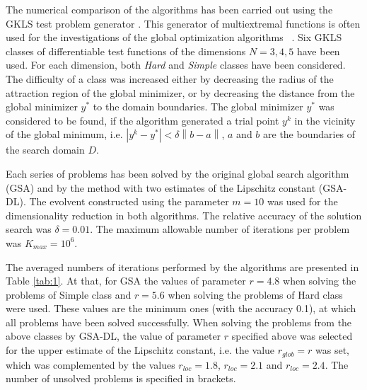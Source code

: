 \documentclass[runningheads]{llncs}
\begin{document}
The numerical comparison of the algorithms has been carried out using the GKLS 
test problem generator \cite{Gaviano2003}. 
This generator of multiextremal functions is often used for the investigations of the global 
optimization algorithms ~\cite{Barkalov2018,Paulavicius2014,Sergeyev2015}.
Six GKLS classes of differentiable test functions of the dimensions $N = 3,4,5$
have been used. For each dimension, both \textit{Hard} and \textit{Simple}
classes have been considered. The difficulty of a class was increased either by
decreasing the radius of the attraction region of the global minimizer, or by
decreasing the distance from the global minimizer $y^\ast$ to the domain
boundaries. The global minimizer $y^\ast$ was considered to be found, if the
algorithm generated a trial point $y^k$ in the vicinity of the global minimum,
i.e. $\left|y^k-y^\ast\right| <\delta\left\|b-a\right\|$, 
$a$ and $b$ are the boundaries of the search domain $D$. 

Each series of problems has been solved by the original global search algorithm (GSA) and by the method with two estimates of the Lipschitz constant (GSA-DL). The evolvent constructed using the parameter $m = 10$ was used for the dimensionality reduction in both algorithms. The relative accuracy of the solution search was $\delta = 0.01$.%
The maximum allowable number of iterations per problem was $K_{max} = 10^6$.

The averaged numbers of iterations performed by the algorithms are presented in Table \ref{tab:1}.
At that, for GSA the values of parameter $r=4.8$ when solving the problems of Simple class and $r=5.6$ when solving the problems of Hard class were used. 
These values are the minimum ones (with the accuracy 0.1), at which all problems have been solved successfully.
When solving the problems from the above classes by GSA-DL, the value of parameter $r$ specified above was selected for the upper estimate of the Lipschitz constant, i.e. the value $r_{glob} = r$ was set, which was complemented by the values $r_{loc}=1.8$, $r_{loc}=2.1$ and $r_{loc}=2.4$. 
The number of unsolved problems is specified in brackets.
\end{document}
